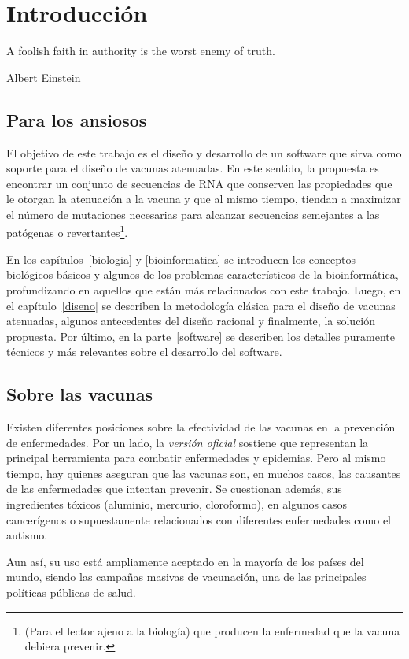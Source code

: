 \chapter{Introducci\'on}
\epigraph{A foolish faith in authority is the worst enemy of truth.}%
         {Albert Einstein}

\section{Para los ansiosos}
El objetivo de este trabajo es el dise\~no y desarrollo de un software que
sirva como soporte para el dise\~no de vacunas atenuadas. En este sentido, la
propuesta es encontrar un conjunto de secuencias de \ac{RNA} que conserven las
propiedades que le otorgan la atenuaci\'on a la vacuna y que al mismo tiempo,
tiendan a maximizar el n\'umero de mutaciones necesarias para alcanzar
secuencias semejantes a las pat\'ogenas o revertantes\footnote{(Para el lector
ajeno a la biolog\'ia) que producen la enfermedad que la vacuna debiera
prevenir.}. 

En los cap\'itulos~\ref{biologia} y \ref{bioinformatica} se introducen los
conceptos biol\'ogicos b\'asicos y algunos de los problemas caracter\'isticos
de la bioinform\'atica, profundizando en aquellos que est\'an m\'as relacionados
con este trabajo. Luego, en el cap\'itulo~\ref{diseno} se describen la
metodolog\'ia cl\'asica para el dise\~no de vacunas atenuadas, algunos
antecedentes del dise\~no racional y finalmente, la soluci\'on propuesta. Por
\'ultimo, en la parte~\ref{software} se describen los detalles puramente
t\'ecnicos y m\'as relevantes sobre el desarrollo del software.

\section{Sobre las vacunas}
\label{vacunas}
Existen diferentes posiciones sobre la efectividad de las vacunas en la
prevenci\'on de enfermedades. Por un lado, la \textit{versi\'on oficial}
sostiene que representan la principal herramienta para combatir enfermedades y
epidemias. Pero al mismo tiempo, hay quienes aseguran que las vacunas son, en
muchos casos, las causantes de las enfermedades que intentan prevenir. Se
cuestionan adem\'as, sus ingredientes t\'oxicos (aluminio, mercurio,
cloroformo), en algunos casos cancer\'igenos o supuestamente relacionados con
diferentes enfermedades como el autismo.

Aun as\'i, su uso est\'a ampliamente aceptado en la mayor\'ia de los pa\'ises
del mundo, siendo las campa\~nas masivas de vacunaci\'on, una de las
principales pol\'iticas p\'ublicas de salud. 

